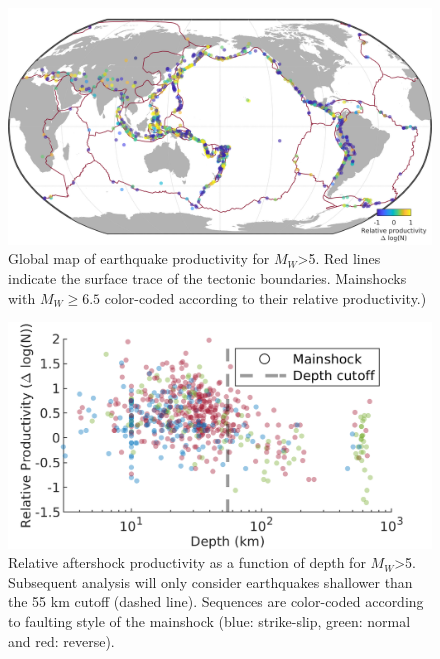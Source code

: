 \documentclass[draft]{agujournal}
\begin{document}
\begin{figure}
\includegraphics{figures/worldmap_res_mw5.png}
\caption{Global map of earthquake productivity for $M_W$>5. Red lines indicate the surface trace of the tectonic boundaries. Mainshocks with $M_W\ge6.5$ color-coded according to their relative productivity.)
} 
\label{fig:global_res}
\end{figure}

\begin{figure}
\centering
\includegraphics{figures/prod_vs_depth_mw5.png}
\caption{Relative aftershock productivity as a function of depth for $M_W$>5. Subsequent analysis will only consider earthquakes shallower than the 55 km cutoff (dashed line). Sequences are color-coded according to faulting style of the mainshock (blue: strike-slip, green: normal and red: reverse).}
\label{fig:prod_vs_depth}
\end{figure}
\end{document}
